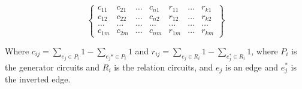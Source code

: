 \documentclass[11pt, a4paper,draft]{report}
\begin{document}

    \[\begin{Bmatrix}
          c_{11} & c_{21} & \ldots &c_{n1} & r_{11} & \ldots  & r_{k1}\\
          c_{12} & c_{22} & \ldots &c_{n2} & r_{12} & \ldots  & r_{k2}\\
          \ldots & \ldots & \ldots & \ldots & \ldots & \ldots & \ldots \\
          c_{1m} & c_{2m} & \ldots &c_{nm} & r_{1m} & \ldots  & r_{km}
    \end{Bmatrix}\]

    Where $c_{ij} = \sum_{e_j\in P_i} 1 - \sum_{e_j*\in P_i}1$ and $r_{ij} = \sum_{e_j\in R_i} 1 - \sum_{e_j^*\in R_i}1$, where $P_i$ is the generator circuits and $R_i$ is the relation circuits, and $e_j$ is an edge and $e_j^*$ is the inverted edge.
\end{document}
